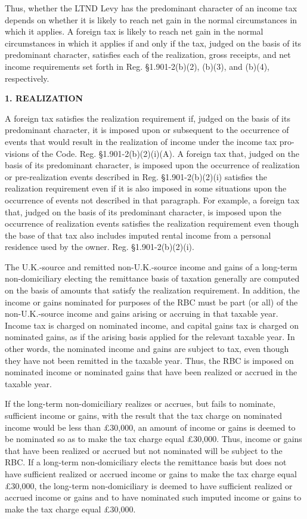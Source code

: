 \begin{select}
Thus, whether the LTND Levy has the predominant character of an income tax depends on whether it is likely to reach net gain in the normal circumstances in which it applies. A foreign tax is likely to reach net gain in the normal circumstances in which it applies if and only if the tax, judged on the basis of its predominant character, satisfies each of the realization, gross receipts, and net income requirements set forth in Reg. \S1.901-2(b)(2), (b)(3), and (b)(4), respectively.

\begin{center}
\textbf{1. REALIZATION}
\end{center}

A foreign tax satisfies the realization requirement if, judged on the basis of its predominant character, it is imposed upon or subsequent to the occurrence of events that would result in the realization of income under the income tax pro- visions of the Code. Reg. \S1.901-2(b)(2)(i)(A). A foreign tax that, judged on the basis of its predominant character, is imposed upon the occurrence of realization or pre-realization events described in Reg. \S1.901-2(b)(2)(i) satisfies the realization requirement even if it is also imposed in some situations upon the occurrence of events not described in that paragraph. For example, a foreign tax that, judged on the basis of its predominant character, is imposed upon the occurrence of realization events satisfies the realization requirement even though the base of that tax also includes imputed rental income from a personal residence used by the owner. Reg. \S1.901-2(b)(2)(i).

The U.K.-source and remitted non-U.K.-source income and gains of a long-term non-domiciliary electing the remittance basis of taxation generally are computed on the basis of amounts that satisfy the realization requirement. In addition, the income or gains nominated for purposes of the RBC must be part (or all) of the non-U.K.-source income and gains arising or accruing in that taxable year. Income tax is charged on nominated income, and capital gains tax is charged on nominated gains, as if the arising basis applied for the relevant taxable year. In other words, the nominated income and gains are subject to tax, even though they have not been remitted in the taxable year. Thus, the RBC is imposed on nominated income or nominated gains that have been realized or accrued in the taxable year.

If the long-term non-domiciliary realizes or accrues, but fails to nominate, sufficient income or gains, with the result that the tax charge on nominated income would be less than \pounds30,000, an amount of income or gains is deemed to be nominated so as to make the tax charge equal \pounds30,000. Thus, income or gains that have been realized or accrued but not nominated will be subject to the RBC. If a long-term non-domiciliary elects the remittance basis but does not have sufficient realized or accrued income or gains to make the tax charge equal \pounds30,000, the long-term non-domiciliary is deemed to have sufficient realized or accrued income or gains and to have nominated such imputed income or gains to make the tax charge equal \pounds30,000.


\end{select}
